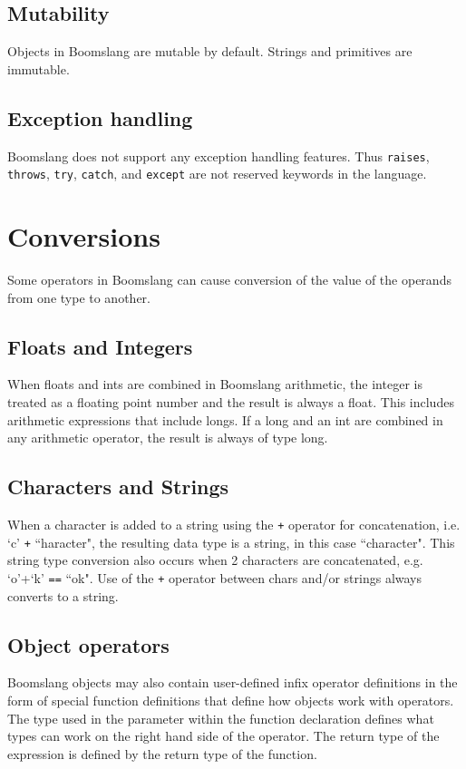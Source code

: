 \documentclass{article}
\begin{document}
\subsection{Mutability}
Objects in Boomslang are mutable by default. Strings and primitives are immutable.

\subsection{Exception handling}
Boomslang does not support any exception handling features. Thus \texttt{raises}, \texttt{throws}, \texttt{try}, \texttt{catch}, and \texttt{except} are not reserved keywords in the language.

\section{Conversions}
\label{sec:conversions}
Some operators in Boomslang can cause conversion of the value of the operands from one type to another.  

\subsection{Floats and Integers}
When floats and ints are combined in Boomslang arithmetic, the integer is treated as a floating point number and the result is always a float.  This includes arithmetic expressions that include longs. If a long and an int are combined in any arithmetic operator, the result is always of type long.

\subsection{Characters and Strings}
When a character is added to a string using the \texttt{+} operator for concatenation, i.e. `c' \texttt{+} ``haracter", the resulting data type is a string, in this case ``character".  This string type conversion also occurs when 2 characters are concatenated, e.g. `o'+`k' \texttt{==} ``ok".  Use of the \texttt{+} operator between chars and/or strings always converts to a string.

\subsection{Object operators}
\label{sec:object-operators}

Boomslang objects may also contain user-defined infix operator definitions in the form of special function definitions that define how objects work with operators.  The type used in the parameter within the function declaration defines what types can work on the right hand side of the operator.  The return type of the expression is defined by the return  type of the function.  
\end{document}
